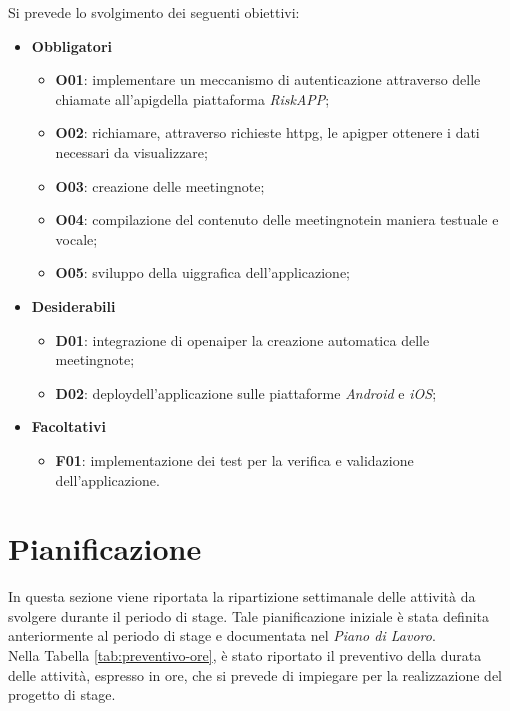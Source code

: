Si prevede lo svolgimento dei seguenti obiettivi:
\begin{itemize}
    \item \textbf{Obbligatori}
    \begin{itemize}
        \item \textbf{O01}\label{O01}: implementare un meccanismo di autenticazione attraverso delle chiamate all'\gls{apig}\glsoccur della piattaforma \emph{RiskAPP};
        \item \textbf{O02}\label{O02}: richiamare, attraverso richieste \gls{httpg}\glsoccur, le \gls{apig}\glsoccur per ottenere i dati necessari da visualizzare;
        \item \textbf{O03}\label{O03}: creazione delle \gls{meetingnote}\glsoccur;
        \item \textbf{O04}\label{O04}: compilazione del contenuto delle \gls{meetingnote}\glsoccur in maniera testuale e vocale;
        \item \textbf{O05}\label{O05}: sviluppo della \gls{uig}\glsoccur grafica dell'applicazione;
    \end{itemize}
    \item \textbf{Desiderabili}
    \begin{itemize}
        \item \textbf{D01}\label{D01}: integrazione di \gls{openai}\glsoccur per la creazione automatica delle \gls{meetingnote}\glsoccur;
        \item \textbf{D02}\label{D02}: \gls{deploy}\glsoccur dell'applicazione sulle piattaforme \emph{Android} e \emph{iOS};
    \end{itemize}
    \item \textbf{Facoltativi}
    \begin{itemize}
        \item \textbf{F01}\label{F01}: implementazione dei test per la verifica e validazione dell'applicazione.
    \end{itemize}
\end{itemize}

\section{Pianificazione}
\label{sec:pianificazione}

In questa sezione viene riportata la ripartizione settimanale delle attività da svolgere durante il periodo di stage. 
Tale pianificazione iniziale è stata definita anteriormente al periodo di stage e documentata nel \emph{Piano di Lavoro}.\\
Nella Tabella \ref{tab:preventivo-ore}, è stato riportato il preventivo della durata delle attività, espresso in ore, che si prevede di impiegare per la realizzazione del progetto di stage. \\

